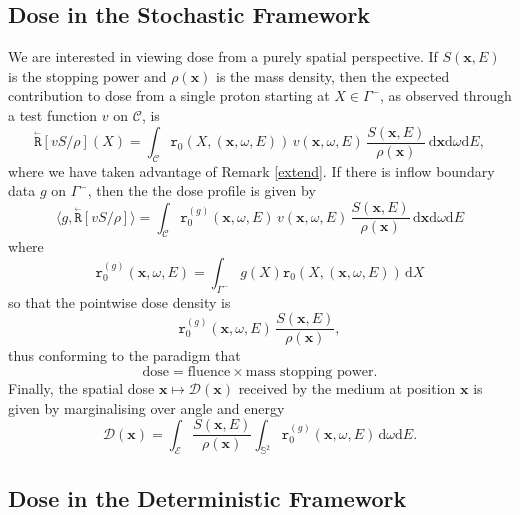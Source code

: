 \documentclass{amsart}
\newcommand{\dd}{{\mathrm d}}
\newcommand{\bR}{\stackrel{_\leftarrow}{\mathtt R}}
\newcommand{\rr}{{\mathtt r}}
\theoremstyle{plain}
\renewcommand{\vec}[1]{\ensuremath{\boldsymbol{#1}}}
\begin{document}
\subsection{Dose in the Stochastic Framework}

We are interested 
in viewing dose from a purely spatial perspective. If $S(\vec{x}, E)$
is the stopping power and $\rho(\vec x)$ is the mass density, then the
expected contribution to dose from a single proton starting at $X \in
\Gamma^-$, as observed through a test function $v$ on $\mathcal{C}$,
is
\begin{equation}
\bR[vS/\rho](X) =   \int_{\mathcal{C}}  \rr_0(X, (\vec{x}, \omega, E)) \,v(\vec{x}, \omega, E) \, \frac{S(\vec{x}, E)}{\rho(\vec{x})} \, \dd \vec{x} \dd \omega \dd E,
  \label{dose-stochastic}
\end{equation}
where we have taken advantage of Remark \ref{extend}.
If there is inflow boundary data $g$ on
$\Gamma^-$, then the the dose profile is given by 
\begin{equation}
\langle g, \bR[vS/\rho]\rangle = \int_{\mathcal{C}} \rr_0^{(g)}(\vec{x}, \omega, E) \,v(\vec{x}, \omega, E) \, \frac{S(\vec{x}, E)}{\rho(\vec{x})} \, \dd \vec{x} \dd \omega \dd E
\end{equation} 
where 
\begin{equation}
  \rr_0^{(g)}(\vec{x}, \omega, E) = \int_{\Gamma^-} g(X)\rr_0(X, (\vec{x}, \omega, E))\,\dd X
\end{equation}
so that the pointwise dose density is
\begin{equation}
  \rr_0^{(g)}(\vec{x}, \omega, E) \, \frac{S(\vec{x}, E)}{\rho(\vec{x})},
  \label{dose-density}
\end{equation}
thus conforming to the paradigm that
\begin{equation}
  \text{dose} = \text{fluence} \times \text{mass stopping power}.
\end{equation}
Finally, the spatial dose $\vec x \mapsto \mathcal{D}(\vec x)$
received by the medium at position $\vec x$ is given by marginalising
over angle and energy
\begin{equation}
  \label{spatialdose}
  \mathcal{D}(\vec x) = \int_{\mathcal{E}} \frac{S(\vec{x}, E)}{\rho(\vec{x})} \int_{\mathbb{S}^2} \rr^{(g)}_0(\vec{x}, \omega, E) \, \dd \omega \dd E.
\end{equation}

\subsection{Dose in the Deterministic Framework}
\end{document}
